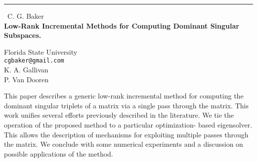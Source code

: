 \documentclass{report}
\begin{document}
\begin{center}
\rule{6in}{1pt} \
{\large C. G. Baker \\
{\bf Low-Rank Incremental Methods for Computing Dominant Singular Subspaces.
}}

Florida State University \\ 
{\tt cgbaker@gmail.com}\\
K. A. Gallivan \\ %
P. Van Dooren %
\end{center}

This paper describes a generic low-rank incremental method for computing the dominant singular
triplets of a matrix via a single pass through the matrix. This work unifies several efforts previously
described in the literature. We tie the operation of the proposed method to a particular optimization-
based eigensolver. This allows the description of mechanisms for exploiting multiple passes through the
matrix. We conclude with some numerical experiments and a discussion on possible applications of the
method. 
\end{document}
